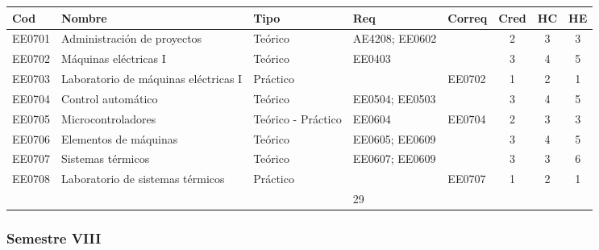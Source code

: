 \begin{center}
\small
\begin{adjustbox}{max width=\textwidth}
\begin{tabular}{|>{\RaggedRight\arraybackslash}p{1.25cm}|>{\RaggedRight\arraybackslash}p{5.2cm}|>{\RaggedRight\arraybackslash}p{1.65cm}|p{1.25cm}|p{1.25cm}|c|c|c|}
\hline
\rowcolor{grisEncabezado}
Cod & Nombre & Tipo & Req & Correq & Cred & HC & HE \\ \hline
EE0701 & Administración de proyectos & Teórico & AE4208; EE0602 &  & 2 & 3 & 3 \\ \hline
\rowcolor{azulTabla}
EE0702 & Máquinas eléctricas I & Teórico & EE0403 &  & 3 & 4 & 5 \\ \hline
EE0703 & Laboratorio de máquinas eléctricas I & Práctico &  & EE0702 & 1 & 2 & 1 \\ \hline
\rowcolor{azulTabla}
EE0704 & Control automático & Teórico & EE0504; EE0503 &  & 3 & 4 & 5 \\ \hline
EE0705 & Microcontroladores & Teórico - Práctico & EE0604 & EE0704 & 2 & 3 & 3 \\ \hline
\rowcolor{azulTabla}
EE0706 & Elementos de máquinas & Teórico & EE0605; EE0609 &  & 3 & 4 & 5 \\ \hline
EE0707 & Sistemas térmicos & Teórico & EE0607; EE0609 &  & 3 & 3 & 6 \\ \hline
\rowcolor{azulTabla}
EE0708 & Laboratorio de sistemas térmicos & Práctico &  & EE0707 & 1 & 2 & 1 \\ \hline
\multicolumn{5}{|l|}{Total} & 18 & 25 & 29 \\ \hline
\end{tabular}
\end{adjustbox}
\end{center}

\subsubsection*{Semestre VIII}

